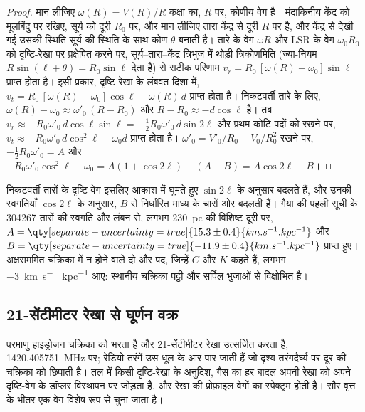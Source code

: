 \begin{proof}
मान लीजिए $\omega(R) = V(R)/R$ कक्षा का, $R$ पर, कोणीय वेग है।
मंदाकिनीय केंद्र को मूलबिंदु पर रखिए, सूर्य को दूरी $R_0$ पर, और मान लीजिए तारा
केंद्र से दूरी $R$ पर है, और केंद्र से देखी गई उसकी स्थिति
सूर्य की स्थिति के साथ कोण $\theta$ बनाती है।
तारे के वेग $\omega R$ और LSR के वेग $\omega_0 R_0$ को दृष्टि-रेखा पर प्रक्षेपित करने पर,
सूर्य--तारा--केंद्र त्रिभुज में थोड़ी त्रिकोणमिति (ज्या-नियम
$R\sin(\ell + \theta) = R_0\sin\ell$ देता है) से सटीक परिणाम
$v_r = R_0\,[\omega(R) - \omega_0]\sin\ell$ प्राप्त होता है। इसी प्रकार,
दृष्टि-रेखा के लंबवत दिशा में,
$v_t = R_0\,[\omega(R) - \omega_0]\cos\ell - \omega(R)\,d$ प्राप्त होता है। निकटवर्ती तारे के लिए,
$\omega(R) - \omega_0 \approx \omega'_0\,(R - R_0)$ और
$R - R_0 \approx -d\cos\ell$ है। तब
$v_r \approx -R_0\omega'_0\,d\cos\ell\sin\ell = -\tfrac12 R_0\omega'_0\,
d\sin 2\ell$ और प्रथम-कोटि पदों को रखने पर,
$v_t \approx -R_0\omega'_0\,d\cos^2\ell - \omega_0 d$ प्राप्त होता है।
$\omega'_0 = V'_0/R_0 - V_0/R_0^2$ रखने पर, $-\tfrac12 R_0\omega'_0 = A$ और
$-R_0\omega'_0\cos^2\ell - \omega_0 = A(1 + \cos 2\ell) - (A - B) =
A\cos 2\ell + B$।
\end{proof}

निकटवर्ती तारों के दृष्टि-वेग इसलिए आकाश में घूमते हुए $\sin 2\ell$ के अनुसार बदलते हैं,
और उनकी स्वगतियाँ $\cos 2\ell$ के अनुसार, $B$ से निर्धारित माध्य के चारों ओर बदलती हैं।
गैया की पहली सूची के \num{304267} तारों की स्वगति और लंबन से,
लगभग \qty{230}{pc} की विशिष्ट दूरी पर, 
$A = \qty[separate-uncertainty=true]{15.3 \pm 0.4}{km.s^{-1}.kpc^{-1}}$
और $B = \qty[separate-uncertainty=true]{-11.9 \pm 0.4}{km.s^{-1}.kpc^{-1}}$ प्राप्त हुए।
अक्षसममित चक्रिका में न होने वाले दो और पद, जिन्हें $C$
और $K$ कहते हैं, लगभग \qty{-3}{km.s^{-1}.kpc^{-1}} आए: स्थानीय चक्रिका
पट्टी और सर्पिल भुजाओं से विक्षोभित है।

\subsection*{21-सेंटीमीटर रेखा से घूर्णन वक्र}

परमाणु हाइड्रोजन चक्रिका को भरता है और 21-सेंटीमीटर रेखा उत्सर्जित करता है,
\qty{1420.405751}{MHz} पर; रेडियो तरंगें उस धूल के आर-पार जाती हैं जो
दृश्य तरंगदैर्घ्य पर दूर की चक्रिका को छिपाती है। तल में किसी दृष्टि-रेखा के
अनुदिश, गैस का हर बादल अपनी रेखा को अपने दृष्टि-वेग के
डॉप्लर विस्थापन पर जोड़ता है, और रेखा की प्रोफ़ाइल वेगों का
स्पेक्ट्रम होती है। सौर वृत्त के भीतर एक वेग विशेष रूप से चुना जाता है।

